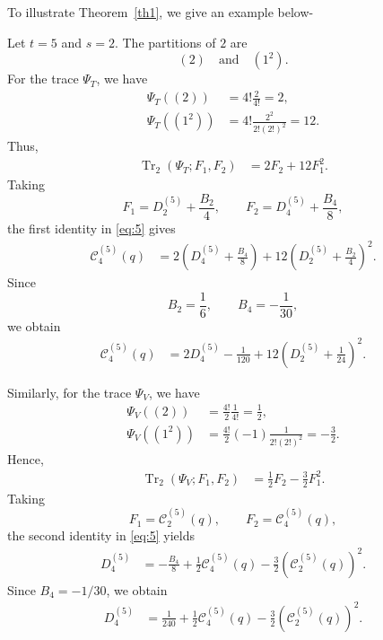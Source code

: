 \documentclass[12pt,oneside,reqno]{amsart}
\numberwithin{equation}{section}
\begin{document}
To illustrate Theorem~\eqref{th1}, we give an example below-

Let $t=5$ and $s=2$. The partitions of $2$ are
\[
(2) \quad \text{and} \quad (1^2).
\]
For the trace $\Psi_T$, we have
\begin{align*}
	\Psi_T((2))
	&=4!\frac{2}{4!}
	=2,
	\\
	\Psi_T((1^2))
	&=4!\frac{2^2}{2!(2!)^2}
	=12.
\end{align*}
Thus,
\begin{align*}
	\operatorname{Tr}_2(\Psi_T;F_1,F_2)
	&=2F_2+12F_1^2.
\end{align*}
Taking
\[
F_1=D_2^{(5)}+\frac{B_2}{4},
\qquad
F_2=D_4^{(5)}+\frac{B_4}{8},
\]
the first identity in \eqref{eq:5} gives
\begin{align*}
	\mathcal{C}_4^{(5)}(q)
	&=
	2\left(D_4^{(5)}+\frac{B_4}{8}\right)
	+12\left(D_2^{(5)}+\frac{B_2}{4}\right)^2.
\end{align*}
Since
\[
B_2=\frac{1}{6},
\qquad
B_4=-\frac{1}{30},
\]
we obtain
\begin{align*}
	\mathcal{C}_4^{(5)}(q)
	&=
	2D_4^{(5)}
	-\frac{1}{120}
	+12\left(D_2^{(5)}+\frac{1}{24}\right)^2.
\end{align*}

Similarly, for the trace $\Psi_V$, we have
\begin{align*}
	\Psi_V((2))
	&=\frac{4!}{2}\frac{1}{4!}
	=\frac{1}{2},
	\\
	\Psi_V((1^2))
	&=\frac{4!}{2}(-1)
	\frac{1}{2!(2!)^2}
	=-\frac{3}{2}.
\end{align*}
Hence,
\begin{align*}
	\operatorname{Tr}_2(\Psi_V;F_1,F_2)
	&=\frac{1}{2}F_2-\frac{3}{2}F_1^2.
\end{align*}
Taking
\[
F_1=\mathcal{C}_2^{(5)}(q),
\qquad
F_2=\mathcal{C}_4^{(5)}(q),
\]
the second identity in \eqref{eq:5} yields
\begin{align*}
	D_4^{(5)}
	&=
	-\frac{B_4}{8}
	+\frac{1}{2}\mathcal{C}_4^{(5)}(q)
	-\frac{3}{2}
	\left(\mathcal{C}_2^{(5)}(q)\right)^2.
\end{align*}
Since $B_4=-1/30$, we obtain
\begin{align*}
	D_4^{(5)}
	&=
	\frac{1}{240}
	+\frac{1}{2}\mathcal{C}_4^{(5)}(q)
	-\frac{3}{2}
	\left(\mathcal{C}_2^{(5)}(q)\right)^2.
\end{align*}
\end{document}
